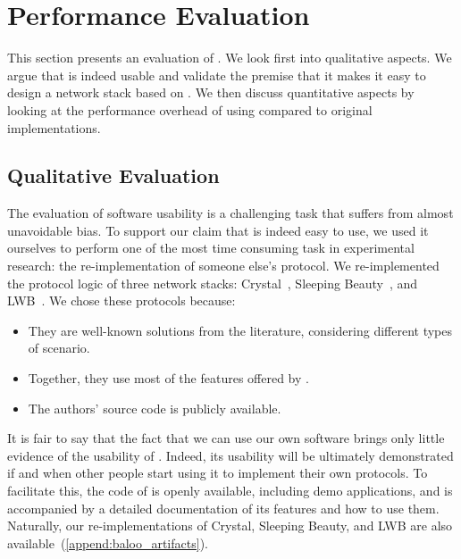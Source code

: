 
\section{Performance Evaluation}
\label{sec:baloo_eval}

This section presents an evaluation of \baloo.
We look first into qualitative aspects. We argue that \baloo is indeed usable and validate the premise that it makes it easy to design a network stack based on \ST.
We then discuss quantitative aspects by looking at the performance overhead of using \baloo compared to original implementations.

\subsection{Qualitative Evaluation}
\label{subsec:usability}

The evaluation of software usability is a challenging task that suffers from almost unavoidable bias.
To support our claim that \baloo is indeed easy to use, we used it ourselves to perform one of the most time consuming task in experimental research: the re-implementation of someone else's protocol.
We re-implemented the protocol logic of three network stacks: Crystal~\cite{istomin2018Interferenceresilient}, Sleeping Beauty~\cite{sarkar2016Sleeping}, and LWB~\cite{ferrari2012LWB}. We chose these protocols because:
\begin{itemize}

	\item They are well-known solutions from the literature, considering different types of scenario.

	\item Together, they use most of the features offered by \baloo.

	\item The authors' source code is publicly available.

\end{itemize}


It is fair to say that the fact that {we} can use {our} own software brings only little evidence of the usability of \baloo.
Indeed, its usability will be ultimately demonstrated if and when other people start using it to implement their own protocols.
To facilitate this, the code of \baloo is openly available, including demo applications, and is accompanied by a detailed documentation of its features and how to use them.
Naturally, our re-implementations of Crystal, Sleeping Beauty, and LWB are also available~(\cref{append:baloo_artifacts}).

